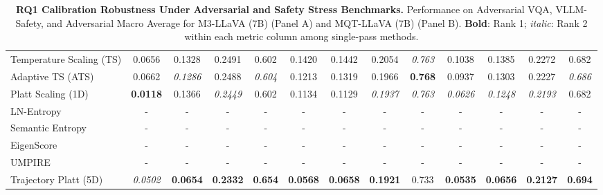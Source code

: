 \begin{table}[t]
{\begin{tabular}{l cccccccccccc}
Temperature Scaling (TS) & 0.0656 & 0.1328 & 0.2491 & 0.602 & 0.1420 & 0.1442 & 0.2054 & \textit{0.763} & 0.1038 & 0.1385 & 0.2272 & 0.682 \\
Adaptive TS (ATS) & 0.0662 & \textit{0.1286} & 0.2488 & \textit{0.604} & 0.1213 & 0.1319 & 0.1966 & \textbf{0.768} & 0.0937 & 0.1303 & 0.2227 & \textit{0.686} \\
Platt Scaling (1D) & \textbf{0.0118} & 0.1366 & \textit{0.2449} & 0.602 & 0.1134 & 0.1129 & \textit{0.1937} & \textit{0.763} & \textit{0.0626} & \textit{0.1248} & \textit{0.2193} & 0.682 \\
LN-Entropy & - & - & - & - & - & - & - & - & - & - & - & - \\
Semantic Entropy & - & - & - & - & - & - & - & - & - & - & - & - \\
EigenScore & - & - & - & - & - & - & - & - & - & - & - & - \\
UMPIRE & - & - & - & - & - & - & - & - & - & - & - & - \\
Trajectory Platt (5D) & \textit{0.0502} & \textbf{0.0654} & \textbf{0.2332} & \textbf{0.654} & \textbf{0.0568} & \textbf{0.0658} & \textbf{0.1921} & 0.733 & \textbf{0.0535} & \textbf{0.0656} & \textbf{0.2127} & \textbf{0.694} \\
\bottomrule
\end{tabular}%
}
\caption{\textbf{RQ1 Calibration Robustness Under Adversarial and Safety Stress Benchmarks.} Performance on Adversarial VQA, VLLM-Safety, and Adversarial Macro Average for M3-LLaVA (7B) (Panel A) and MQT-LLaVA (7B) (Panel B). \textbf{Bold}: Rank 1; \textit{italic}: Rank 2 within each metric column among single-pass methods.}
\label{tab:rq1_adversarial_benchmark}
\end{table}
